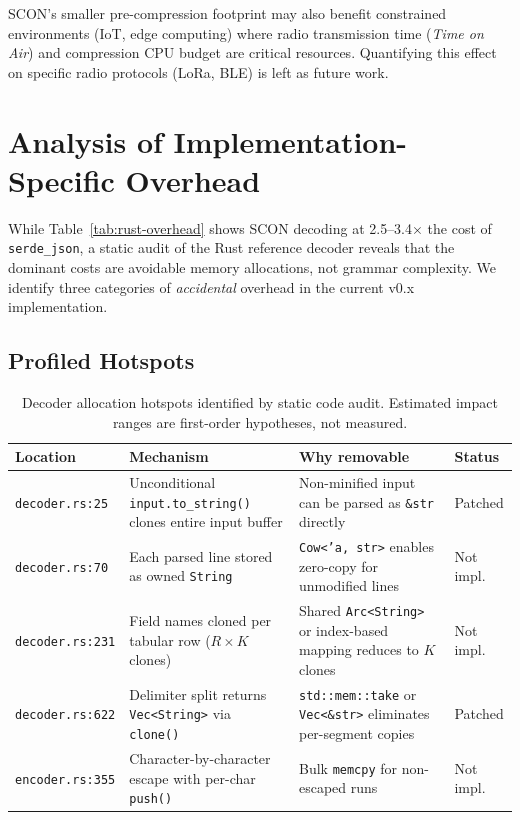 \documentclass[11pt, a4paper]{article}
\begin{document}
SCON's smaller pre-compression footprint may also benefit constrained
environments (IoT, edge computing) where radio transmission time
(\emph{Time on Air}) and compression CPU budget are critical resources.
Quantifying this effect on specific radio protocols (LoRa, BLE) is
left as future work.

\section{Analysis of Implementation-Specific Overhead}
\label{sec:impl-overhead}

While Table~\ref{tab:rust-overhead} shows SCON decoding at 2.5--3.4$\times$ the
cost of \texttt{serde\_json}, a static audit of the Rust reference decoder
reveals that the dominant costs are avoidable memory allocations, not
grammar complexity. We identify three categories of \emph{accidental}
overhead in the current v0.x implementation.

\subsection{Profiled Hotspots}
\label{sec:hotspots}

\begin{table}[ht]
\centering
\caption{Decoder allocation hotspots identified by static code audit.
         Estimated impact ranges are first-order hypotheses, not measured.}
\label{tab:hotspots}
\begin{tabular}{l p{4.5cm} p{3.5cm} l}
\toprule
Location & Mechanism & Why removable & Status \\
\midrule
\texttt{decoder.rs:25}
  & Unconditional \texttt{input.to\_string()} clones entire input buffer
  & Non-minified input can be parsed as \texttt{\&str} directly
  & Patched \\
\texttt{decoder.rs:70}
  & Each parsed line stored as owned \texttt{String}
  & \texttt{Cow<'a, str>} enables zero-copy for unmodified lines
  & Not impl. \\
\texttt{decoder.rs:231}
  & Field names cloned per tabular row ($R \times K$ clones)
  & Shared \texttt{Arc<String>} or index-based mapping reduces to $K$ clones
  & Not impl. \\
\texttt{decoder.rs:622}
  & Delimiter split returns \texttt{Vec<String>} via \texttt{clone()}
  & \texttt{std::mem::take} or \texttt{Vec<\&str>} eliminates per-segment copies
  & Patched \\
\texttt{encoder.rs:355}
  & Character-by-character escape with per-char \texttt{push()}
  & Bulk \texttt{memcpy} for non-escaped runs
  & Not impl. \\
\bottomrule
\end{tabular}
\end{table}
\end{document}
